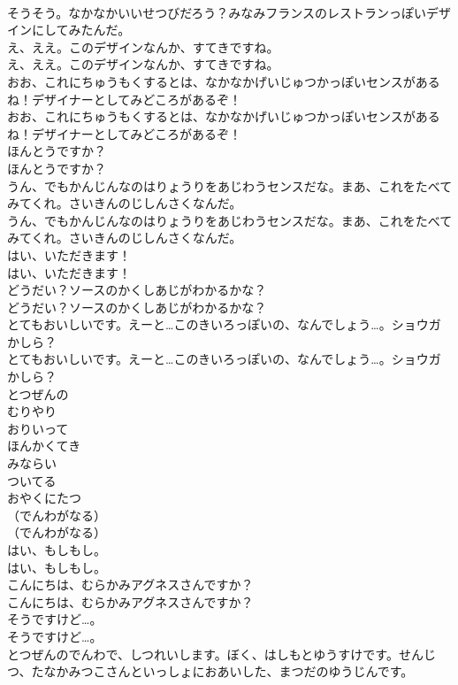 \documentclass[8pt]{extreport}
\begin{document}
\begin{CJK}{UTF8}{min}
\\	そうそう。なかなかいいせつびだろう？みなみフランスのレストランっぽいデザインにしてみたんだ。
\\	え、ええ。このデザインなんか、すてきですね。
\\	え、ええ。このデザインなんか、すてきですね。
\\	おお、これにちゅうもくするとは、なかなかげいじゅつかっぽいセンスがあるね！デザイナーとしてみどころがあるぞ！
\\	おお、これにちゅうもくするとは、なかなかげいじゅつかっぽいセンスがあるね！デザイナーとしてみどころがあるぞ！
\\	ほんとうですか？
\\	ほんとうですか？
\\	うん、でもかんじんなのはりょうりをあじわうセンスだな。まあ、これをたべてみてくれ。さいきんのじしんさくなんだ。
\\	うん、でもかんじんなのはりょうりをあじわうセンスだな。まあ、これをたべてみてくれ。さいきんのじしんさくなんだ。
\\	はい、いただきます！
\\	はい、いただきます！
\\	どうだい？ソースのかくしあじがわかるかな？
\\	どうだい？ソースのかくしあじがわかるかな？
\\	とてもおいしいです。えーと…このきいろっぽいの、なんでしょう…。ショウガかしら？
\\	とてもおいしいです。えーと…このきいろっぽいの、なんでしょう…。ショウガかしら？
\\	とつぜんの
\\	むりやり
\\	おりいって
\\	ほんかくてき
\\	みならい
\\	ついてる
\\	おやくにたつ
\\	（でんわがなる）
\\	（でんわがなる）
\\	はい、もしもし。
\\	はい、もしもし。
\\	こんにちは、むらかみアグネスさんですか？
\\	こんにちは、むらかみアグネスさんですか？
\\	そうですけど…。
\\	そうですけど…。
\\	とつぜんのでんわで、しつれいします。ぼく、はしもとゆうすけです。せんじつ、たなかみつこさんといっしょにおあいした、まつだのゆうじんです。

\end{CJK}
\end{document}
